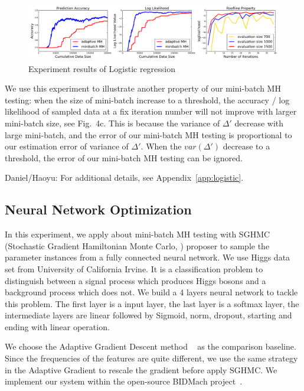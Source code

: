 \documentclass{article}
\begin{document}
\begin{figure}[t]
    \centering
    \includegraphics[width=1\linewidth]{exp2.png}
    \caption{Experiment results of Logistic regression}
\end{figure}

We use this experiment to illustrate another property of our mini-batch MH testing: when the size of
mini-batch increase to a threshold, the accuracy / log likelihood of sampled data at a fix iteration
number will not improve with larger mini-batch size, see Fig.~4c. This is because the variance of
$\Delta'$ decrease with large mini-batch, and the error of our mini-batch MH testing is proportional
to our estimation error of variance of $\Delta'$. When the $var(\Delta')$ decrease to a threshold,
the error of our mini-batch MH testing can be ignored.  

{\color{blue}
Daniel/Haoyu: For additional details, see Appendix~\ref{app:logistic}.
}

\subsection{Neural Network Optimization}\label{ssec:nets}

In this experiment, we apply about mini-batch MH testing with SGHMC (Stochastic Gradient Hamiltonian Monte Carlo, \cite{sghmc_2014}) proposer to sample the parameter instances from a fully connected neural network. We use Higgs data set from University of California Irvine. It is a classification problem to distinguish between a signal process which produces Higgs bosons and a background process which does not. We build a 4 layers neural network to tackle this problem. The first layer is a input layer, the last layer is a softmax layer, the intermediate layers are linear followed by Sigmoid, norm, dropout, starting and ending with linear operation. 

We choose the Adaptive Gradient Descent method ~\cite{adapGrad} as the comparison baseline. Since the frequencies of the features are quite different, we use the same strategy in the Adaptive Gradient to rescale the gradient before apply SGHMC. We implement our system within the open-source BIDMach project~\cite{canny2013bidmach}.  
\end{document}
